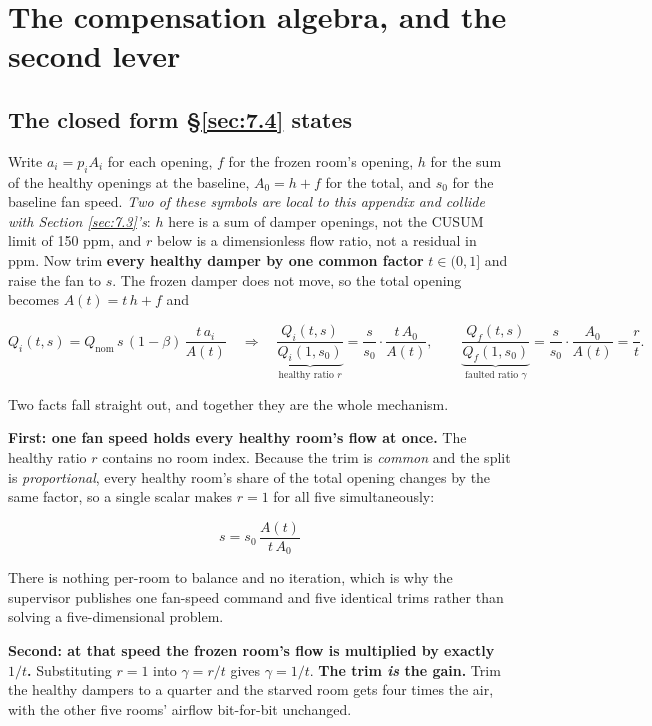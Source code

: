 \section{The compensation algebra, and the second lever}\label{sec:E}

\subsection{The closed form \texorpdfstring{\texorpdfstring{\S\ref{sec:7.4}}{7.4}}{7.4} states}\label{sec:E.1}

Write $a_i = p_i A_i$ for each opening, $f$ for the frozen room's opening, $h$ for the sum of the
healthy openings at the baseline, $A_0 = h + f$ for the total, and $s_0$ for the baseline fan
speed. \emph{Two of these symbols are local to this appendix and collide with Section
\ref{sec:7.3}'s}: $h$ here is a sum of damper openings, not the CUSUM limit of 150 ppm, and $r$ below
is a dimensionless flow ratio, not a residual in ppm. Now trim \textbf{every healthy damper by one
common factor} $t \in (0,1]$ and raise the fan
to $s$. The frozen damper does not move, so the total opening becomes $A(t) = t\,h + f$ and

\[
Q_i(t,s) = Q_\text{nom}\,s\,(1-\beta)\,\frac{t\,a_i}{A(t)}
\quad\Longrightarrow\quad
\underbrace{\frac{Q_i(t,s)}{Q_i(1,s_0)}}_{\text{healthy ratio } r}
= \frac{s}{s_0}\cdot\frac{t\,A_0}{A(t)},
\qquad
\underbrace{\frac{Q_f(t,s)}{Q_f(1,s_0)}}_{\text{faulted ratio } \gamma}
= \frac{s}{s_0}\cdot\frac{A_0}{A(t)}
= \frac{r}{t}.
\]

Two facts fall straight out, and together they are the whole mechanism.

\textbf{First: one fan speed holds every healthy room's flow at once.} The healthy ratio $r$
contains no room index. Because the trim is \emph{common} and the split is \emph{proportional},
every healthy room's share of the total opening changes by the same factor, so a single scalar
makes $r = 1$ for all five simultaneously:

\[ \boxed{\;s = s_0\,\frac{A(t)}{t\,A_0}\;} \]

There is nothing per-room to balance and no iteration, which is why the supervisor publishes one
fan-speed command and five identical trims rather than solving a five-dimensional problem.

\textbf{Second: at that speed the frozen room's flow is multiplied by exactly $1/t$.} Substituting
$r = 1$ into $\gamma = r/t$ gives $\gamma = 1/t$. \textbf{The trim \emph{is} the gain.} Trim the
healthy dampers to a quarter and the starved room gets four times the air, with the other five
rooms' airflow bit-for-bit unchanged.


